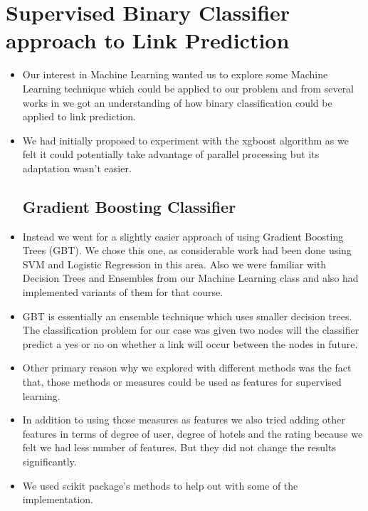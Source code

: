 \documentclass[letterpaper,twocolumn,11pt]{article}
\begin{document}
\section{Supervised Binary Classifier approach to Link Prediction}

\begin{itemize}
\item Our interest in Machine Learning wanted us to explore some Machine Learning technique which could be applied to our problem and from several works in \cite{one,five,seven} we got an understanding of how binary classification could be applied to link prediction.

\item We had initially proposed to experiment with the xgboost algorithm as we felt it could potentially take advantage of parallel processing but its adaptation wasn't easier.

\subsection{Gradient Boosting Classifier}
\item Instead we went for a slightly easier approach of using Gradient Boosting Trees (GBT). We chose this one, as considerable work had been done using SVM and Logistic Regression in this area. Also we were familiar with Decision Trees and Ensembles from our Machine Learning class and also had implemented variants of them for that course.

\item GBT is essentially an ensemble technique which uses smaller decision trees. The classification problem for our case was given two nodes will the classifier predict a yes or no on whether a link will occur between the nodes in future.

\item Other primary reason why we explored with different methods was the fact that, those methods or measures could be used as features for supervised learning.

\item In addition to using those measures as features we also tried adding other features in terms of degree of user, degree of hotels and the rating because we felt we had less number of features. But they did not change the results significantly.

\item We used scikit package's methods to help out with some of the implementation.


\end{itemize}
\end{document}

